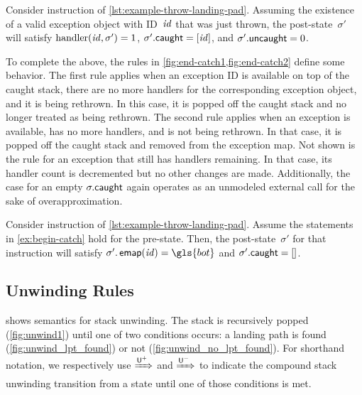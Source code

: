 \begin{example}\label{ex:begin-catch}
  Consider instruction  of \cref{lst:example-throw-landing-pad}.
  Assuming the existence of a valid exception object with ID~$\mathit{id}$ that was just thrown, the post-state~$\sigma'$ will satisfy $\operatorname{handler}(\mathit{id},\sigma')=1$, $\sigma'.\mathsf{caught}=[\mathit{id}]$, and $\sigma'.\mathsf{uncaught}=0$.
\end{example}
To complete the above, the rules in \cref{fig:end-catch1,fig:end-catch2} define some  behavior.
The first rule applies when an exception ID is available on top of the caught stack, there are no more handlers for the corresponding exception object,
and it is being rethrown.
In this case, it is popped off the caught stack and no longer treated as being rethrown.
The second rule applies when an exception is available, has no more handlers, and is not being rethrown. In that case, it is popped off the caught stack and removed from the exception map.
Not shown is the rule for an exception that still has handlers remaining.
In that case, its handler count is decremented but no other changes are made.
Additionally, the case for an empty $\sigma.\mathsf{caught}$ again operates as an unmodeled external call for the sake of overapproximation.
\begin{example}
  Consider instruction  of \cref{lst:example-throw-landing-pad}.
  Assume the statements in \cref{ex:begin-catch} hold for the pre-state.
  Then, the post-state~$\sigma'$ for that instruction will satisfy $\sigma'.\emap(\id)=\gls{bot}$ and $\sigma'.\mathsf{caught}=[]$.
\end{example}
\subsection{Unwinding Rules}
 shows semantics for stack unwinding.
The stack is recursively popped (\cref{fig:unwind1}) until one of two conditions occurs: a landing path is found (\cref{fig:unwind_lpt_found}) or not (\cref{fig:unwind_no_lpt_found}).
For shorthand notation, we respectively use $\xRightarrow{\mathsf U^+}$ and $\xRightarrow{\mathsf U^-}$ to indicate the compound stack unwinding transition from a state until one of those conditions is met.


